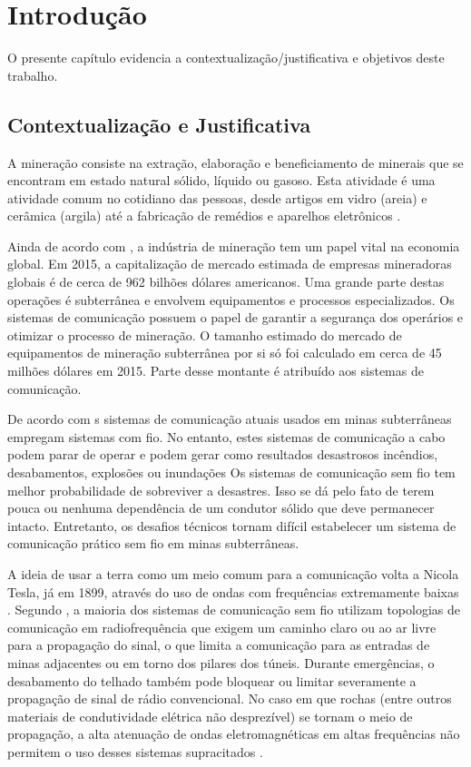 \chapter[Introdução]{Introdução}

O presente capítulo evidencia a contextualização/justificativa e objetivos deste trabalho.

\section{Contextualização e Justificativa}

A mineração consiste na extração, elaboração e beneficiamento de minerais que se encontram em estado natural sólido, líquido ou gasoso. Esta atividade é uma atividade comum no cotidiano das pessoas, desde artigos em vidro (areia) e cerâmica (argila) até a fabricação de remédios e aparelhos eletrônicos \cite{forooshani2013survey}.

Ainda de acordo com , a indústria de mineração tem um papel vital na economia global. Em 2015, a capitalização de mercado estimada de empresas mineradoras globais é de cerca de 962 bilhões dólares americanos. Uma grande parte destas operações é subterrânea e envolvem equipamentos e processos especializados. Os sistemas de comunicação possuem o papel de garantir a segurança dos operários e otimizar o processo de mineração. O tamanho estimado do mercado de equipamentos de mineração subterrânea por si só foi calculado em cerca de 45 milhões dólares em 2015. Parte desse montante é atribuído aos sistemas de comunicação.


De acordo com  s sistemas de comunicação atuais usados em minas subterrâneas empregam sistemas com fio. No entanto, estes sistemas de comunicação a cabo podem parar de operar e podem gerar como resultados desastrosos incêndios, desabamentos, explosões ou inundações Os sistemas de comunicação sem fio tem melhor probabilidade de sobreviver a desastres. Isso se dá pelo fato de terem pouca ou nenhuma dependência de um condutor sólido que deve permanecer intacto. Entretanto, os desafios técnicos tornam difícil estabelecer um sistema de comunicação prático sem fio em minas subterrâneas.

A ideia de usar a terra como um meio comum para a comunicação volta a Nicola Tesla, já em 1899, através do uso de ondas com frequências extremamente baixas \cite{wheeler1961radio}. Segundo , a maioria dos sistemas de comunicação sem fio utilizam topologias de comunicação em radiofrequência que exigem um caminho claro ou ao ar livre para a propagação do sinal, o que limita a comunicação para as entradas de minas adjacentes ou em torno dos pilares dos túneis. Durante emergências, o desabamento do telhado também pode bloquear ou limitar severamente a propagação de sinal de rádio convencional. No caso em que rochas (entre outros materiais de condutividade elétrica não desprezível) se tornam o meio de propagação, a alta atenuação de ondas eletromagnéticas em altas frequências não permitem o uso desses sistemas supracitados \cite{raab1995signal}.

